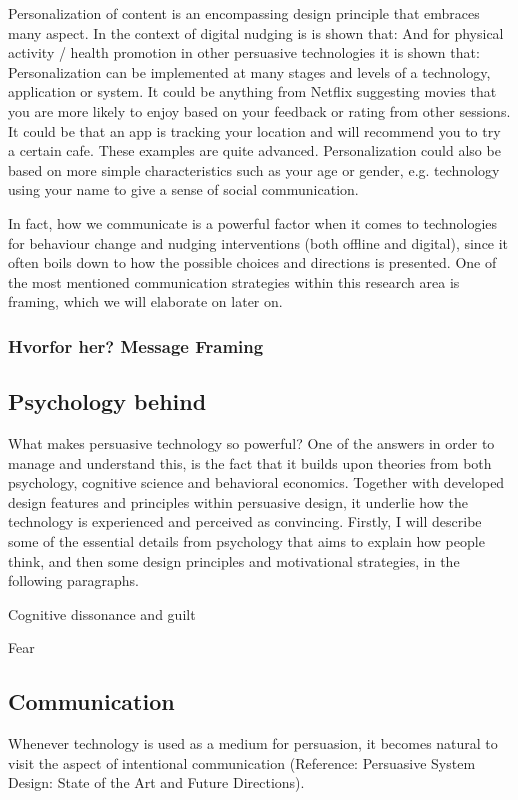Personalization of content is an encompassing design principle that embraces many aspect. In the context of digital nudging is is shown that: 
And for physical activity / health promotion in other persuasive technologies it is shown that: 
Personalization can be implemented at many stages and levels of a technology, application or system. It could be anything from Netflix suggesting movies that you are more likely to enjoy based on your feedback or rating from other sessions. It could be that an app is tracking your location and will recommend you to try a certain cafe. These examples are quite advanced. Personalization could also be based on more simple characteristics such as your age or gender, e.g. technology using your name to give a sense of social communication. 

In fact, how we communicate is a powerful factor when it comes to technologies for behaviour change and nudging interventions (both offline and digital), since it often boils down to how the possible choices and directions is presented. One of the most mentioned communication strategies within this research area is framing, which we will elaborate on later on. 

\subsubsection{Hvorfor her? Message Framing}



\subsection{Psychology behind}
What makes persuasive technology so powerful? One of the answers in order to manage and understand this, is the fact that it builds upon theories from both psychology, cognitive science and behavioral economics. Together with developed design features and principles within persuasive design, it underlie how the technology is experienced and perceived as convincing. Firstly, I will describe some of the essential details from psychology that aims to explain how people think, and then some design principles and motivational strategies, in the following paragraphs. 

Cognitive dissonance and guilt

Fear

\subsection{Communication}
Whenever technology is used as a medium for persuasion, it becomes natural to visit the aspect of intentional communication (Reference: Persuasive System Design: State of the Art and Future Directions). 

